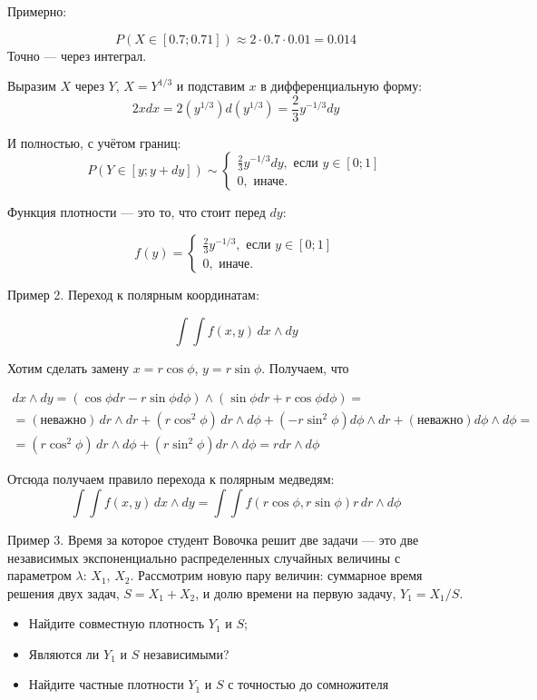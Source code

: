 \documentclass[11pt,russian,]{article}
\providecommand{\tightlist}{%
  \setlength{\itemsep}{0pt}\setlength{\parskip}{0pt}}
\begin{document}
Примерно:

\[
P(X\in [0.7; 0.71]) \approx 2\cdot 0.7 \cdot 0.01 = 0.014
\] Точно --- через интеграл.

Выразим \(X\) через \(Y\), \(X=Y^{1/3}\) и подставим \(x\) в
дифференциальную форму: \[
2xdx = 2(y^{1/3})d(y^{1/3}) = \frac{2}{3}y^{-1/3}dy
\]

И полностью, с учётом границ: \[
P(Y \in [y; y+dy]) \sim \begin{cases}
\frac{2}{3}y^{-1/3}dy, \text{ если } y \in [0;1] \\
0, \text{ иначе.}
\end{cases} 
\]

Функция плотности --- это то, что стоит перед \(dy\):

\[
f(y) = \begin{cases}
\frac{2}{3}y^{-1/3}, \text{ если } y \in [0;1] \\
0, \text{ иначе.}
\end{cases} 
\]

Пример 2. Переход к полярным координатам:

\[
\int \int f(x, y) \, dx \wedge dy 
\]

Хотим сделать замену \(x = r \cos \phi\), \(y = r\sin \phi\). Получаем,
что

\begin{multline}
dx \wedge dy = (\cos \phi dr - r \sin \phi d\phi) \wedge (\sin \phi dr + r\cos \phi d\phi) = \\
=(\text{неважно}) \, dr \wedge dr + (r\cos^2\phi) \, dr \wedge d\phi + (-r\sin^2\phi) d\phi \wedge dr + (\text{неважно}) d\phi \wedge d\phi = \\
= (r\cos^2\phi) \, dr \wedge d\phi + (r\sin^2\phi) dr \wedge d\phi = r dr \wedge d\phi 
\end{multline}

Отсюда получаем правило перехода к полярным медведям: \[
\int \int f(x, y) \, dx \wedge dy = \int \int f(r\cos\phi, r\sin \phi) r \, dr \wedge d \phi
\]

Пример 3. Время за которое студент Вовочка решит две задачи --- это две
независимых экспоненциально распределенных случайных величины с
параметром \(\lambda\): \(X_1\), \(X_2\). Рассмотрим новую пару величин:
суммарное время решения двух задач, \(S = X_1 + X_2\), и долю времени на
первую задачу, \(Y_1 = X_1 / S\).

\begin{itemize}
\tightlist
\item
  Найдите совместную плотность \(Y_1\) и \(S\);
\item
  Являются ли \(Y_1\) и \(S\) независимыми?
\item
  Найдите частные плотности \(Y_1\) и \(S\) с точностью до сомножителя
\end{itemize}
\end{document}

